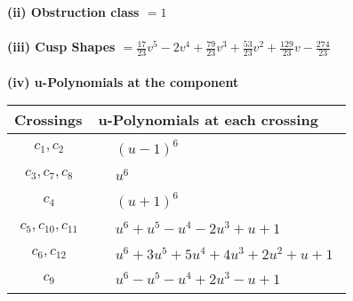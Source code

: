 \documentclass[1p]{elsarticle_modified}
\theoremstyle{definition}
\begin{document}
\flushleft \textbf{(ii) Obstruction class $= 1$}\\~\\
\flushleft \textbf{(iii) Cusp Shapes $= \frac{17}{23} v^5-2 v^4+\frac{79}{23} v^3+\frac{53}{23} v^2+\frac{129}{23} v-\frac{274}{23}$}\\~\\
\newpage\renewcommand{\arraystretch}{1}
\flushleft \textbf{(iv) u-Polynomials at the component}\newline \\
\begin{tabular}{m{50pt}|m{274pt}}
Crossings & \hspace{64pt}u-Polynomials at each crossing \\
\hline $$\begin{aligned}c_{1},c_{2}\end{aligned}$$&$\begin{aligned}
&(u-1)^6
\end{aligned}$\\
\hline $$\begin{aligned}c_{3},c_{7},c_{8}\end{aligned}$$&$\begin{aligned}
&u^6
\end{aligned}$\\
\hline $$\begin{aligned}c_{4}\end{aligned}$$&$\begin{aligned}
&(u+1)^6
\end{aligned}$\\
\hline $$\begin{aligned}c_{5},c_{10},c_{11}\end{aligned}$$&$\begin{aligned}
&u^6+u^5- u^4-2 u^3+u+1
\end{aligned}$\\
\hline $$\begin{aligned}c_{6},c_{12}\end{aligned}$$&$\begin{aligned}
&u^6+3 u^5+5 u^4+4 u^3+2 u^2+u+1
\end{aligned}$\\
\hline $$\begin{aligned}c_{9}\end{aligned}$$&$\begin{aligned}
&u^6- u^5- u^4+2 u^3- u+1
\end{aligned}$\\
\hline
\end{tabular}\\~\\
\end{document}
